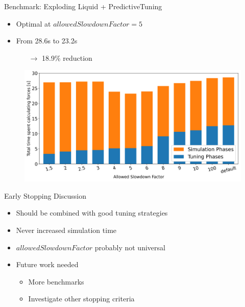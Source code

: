 \documentclass[
	10pt,
	t		%
]{beamer}
\begin{document}
\begin{frame}{Benchmark: Exploding Liquid + PredictiveTuning}

    \begin{itemize}
        \item Optimal at $allowedSlowdownFactor = 5$
        \item From 28.6s to 23.2s
              \begin{itemize}
                  \item[$\rightarrow$] 18.9\% reduction
              \end{itemize}
    \end{itemize}


    \begin{figure}[H]
        \centering

        \includegraphics[width=0.92\columnwidth]{../../data/explodingLiquid/cluster/predictiveTuning/analytics/total_time_average_full_scale.png}


    \end{figure}

\end{frame}


\begin{frame}{Early Stopping Discussion}

    \begin{itemize}
        \item Should be combined with good tuning strategies
        \item Never increased simulation time
        \item $allowedSlowdownFactor$ probably not universal
        \item Future work needed
              \begin{itemize}
                  \item More benchmarks
                  \item Investigate other stopping criteria
              \end{itemize}
    \end{itemize}
\end{frame}
\end{document}
